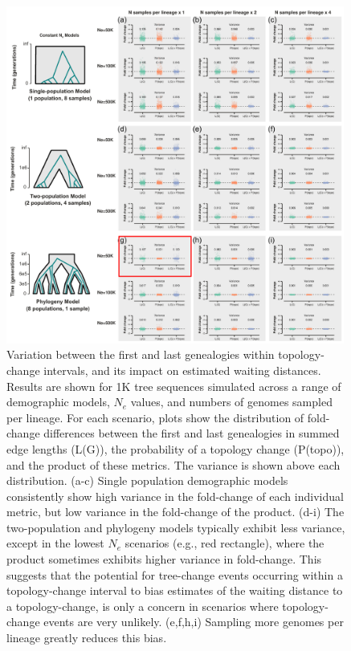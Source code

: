 \documentclass[11pt]{article}
\begin{document}
\begin{figure}[p]
	\centering
	\includegraphics[width=0.99\textwidth]{figures/current/FigS-bias-fold-topo-last-2.pdf}
	\caption{
		Variation between the first and last genealogies within topology-change 
		intervals, and its impact on estimated waiting distances.
		Results are shown for 1K tree sequences simulated across a range of 
		demographic models, $N_e$ values, and numbers of genomes sampled per lineage.
		For each scenario, plots show the distribution of fold-change differences
		between the first and last genealogies in summed edge lengths (L(G)),
		the probability of a topology change (P(topo)), and the product of these
		metrics. The variance is shown above each distribution.
		(a-c) Single population demographic models consistently show high variance
		in the fold-change of each individual metric, but low variance in the
		fold-change of the product.
		(d-i) The two-population and phylogeny models typically exhibit less 
		variance, except in the lowest $N_e$ scenarios (e.g., red rectangle),
		where the product sometimes exhibits higher variance in fold-change.
		This suggests that the potential for tree-change events occurring within a 
		topology-change interval to bias estimates of the waiting distance to a
		topology-change, is only a concern in scenarios where topology-change events
		are very unlikely. (e,f,h,i) Sampling more genomes per lineage greatly 
		reduces this bias.		
	}
     \label{fig:figS-bias-topo-last}
\end{figure}
\end{document}
